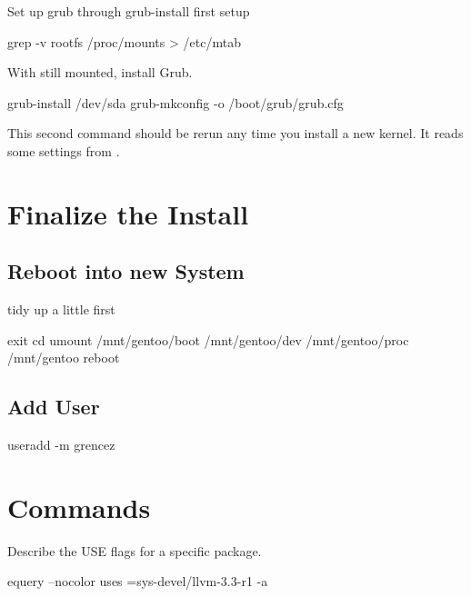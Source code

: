 Set up grub through grub-install
first setup 
\begin{code}
grep -v rootfs /proc/mounts > /etc/mtab
\end{code}
With  still mounted, install Grub.
\begin{code}
grub-install /dev/sda
grub-mkconfig -o /boot/grub/grub.cfg
\end{code}
This second command should be rerun any time you install a new kernel.
It reads some settings from .

\section{Finalize the Install}

\subsection{Reboot into new System}
tidy up a little first
\begin{code}
exit
cd
umount /mnt/gentoo/boot /mnt/gentoo/dev /mnt/gentoo/proc /mnt/gentoo
reboot
\end{code}

\subsection{Add User}

\begin{code}
useradd -m grencez
\end{code}

\section{Commands}
Describe the USE flags for a specific package.
\begin{code}
equery --nocolor uses =sys-devel/llvm-3.3-r1 -a
\end{code}



